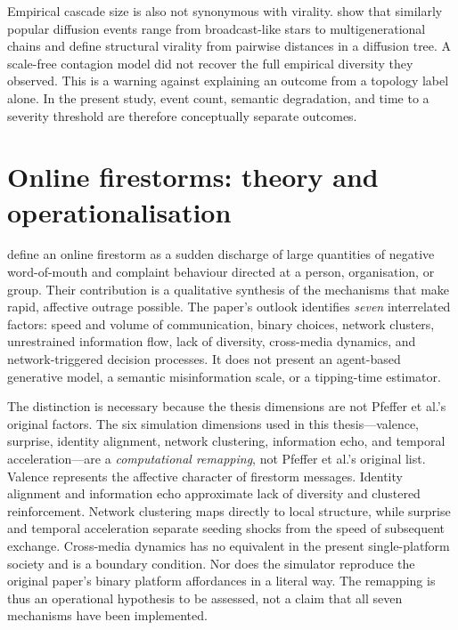 Empirical cascade size is also not synonymous with virality.
\textcite{goel2016virality} show that similarly popular diffusion events range
from broadcast-like stars to multigenerational chains and define structural
virality from pairwise distances in a diffusion tree.  A scale-free contagion
model did not recover the full empirical diversity they observed.  This is a
warning against explaining an outcome from a topology label alone.  In the
present study, event count, semantic degradation, and time to a severity
threshold are therefore conceptually separate outcomes.

\section{Online firestorms: theory and operationalisation}
\label{sec:lit-firestorms}

\textcite{pfeffer2014firestorms} define an online firestorm as a sudden discharge
of large quantities of negative word-of-mouth and complaint behaviour directed
at a person, organisation, or group.  Their contribution is a qualitative
synthesis of the mechanisms that make rapid, affective outrage possible.  The
paper's outlook identifies \emph{seven} interrelated factors: speed and volume
of communication, binary choices, network clusters, unrestrained information
flow, lack of diversity, cross-media dynamics, and network-triggered decision
processes.  It does not present an agent-based generative model, a semantic
misinformation scale, or a tipping-time estimator.

The distinction is necessary because the thesis dimensions are not Pfeffer et al.'s original factors.  The six simulation dimensions
used in this thesis---valence, surprise, identity alignment, network clustering,
information echo, and temporal acceleration---are a \emph{computational
remapping}, not Pfeffer et al.'s original list.  Valence represents the affective
character of firestorm messages.  Identity alignment and information echo
approximate lack of diversity and clustered reinforcement.  Network clustering
maps directly to local structure, while surprise and temporal acceleration
separate seeding shocks from the speed of subsequent exchange.  Cross-media
dynamics has no equivalent in the present single-platform society and is a
boundary condition.  Nor does the simulator reproduce the original paper's
binary platform affordances in a literal way.  The remapping is thus an
operational hypothesis to be assessed, not a claim that all seven mechanisms
have been implemented.

